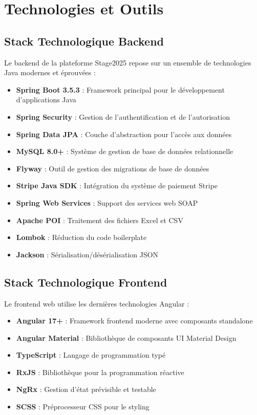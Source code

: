 \documentclass[12pt,a4paper]{report}
\begin{document}
\section{Technologies et Outils}

\subsection{Stack Technologique Backend}

Le backend de la plateforme Stage2025 repose sur un ensemble de technologies Java modernes et éprouvées :

\begin{itemize}
    \item \textbf{Spring Boot 3.5.3} : Framework principal pour le développement d'applications Java
    \item \textbf{Spring Security} : Gestion de l'authentification et de l'autorisation
    \item \textbf{Spring Data JPA} : Couche d'abstraction pour l'accès aux données
    \item \textbf{MySQL 8.0+} : Système de gestion de base de données relationnelle
    \item \textbf{Flyway} : Outil de gestion des migrations de base de données
    \item \textbf{Stripe Java SDK} : Intégration du système de paiement Stripe
    \item \textbf{Spring Web Services} : Support des services web SOAP
    \item \textbf{Apache POI} : Traitement des fichiers Excel et CSV
    \item \textbf{Lombok} : Réduction du code boilerplate
    \item \textbf{Jackson} : Sérialisation/désérialisation JSON
\end{itemize}

\subsection{Stack Technologique Frontend}

Le frontend web utilise les dernières technologies Angular :

\begin{itemize}
    \item \textbf{Angular 17+} : Framework frontend moderne avec composants standalone
    \item \textbf{Angular Material} : Bibliothèque de composants UI Material Design
    \item \textbf{TypeScript} : Langage de programmation typé
    \item \textbf{RxJS} : Bibliothèque pour la programmation réactive
    \item \textbf{NgRx} : Gestion d'état prévisible et testable
    \item \textbf{SCSS} : Préprocesseur CSS pour le styling
\end{itemize}
\end{document}
